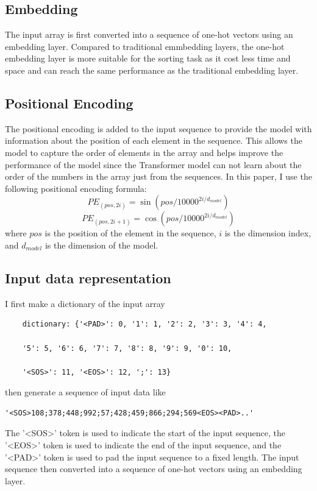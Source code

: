 \documentclass{article}
\begin{document}
\subsection{Embedding}
The input array is first converted into a sequence of one-hot vectors using an embedding layer.\cite{TransfomerPrograming} Compared to traditional emmbedding layers, the one-hot embedding layer is more suitable for the sorting task as it cost less time and space and can reach the same performance as the traditional embedding layer.

\subsection{Positional Encoding}
The positional encoding is added to the input sequence to provide the model with information about the position of each element in the sequence. This allows the model to capture the order of elements in the array and helps improve the performance of the model since the Transformer model can not learn about the order of the numbers in the array just from the sequences.
In this paper, I use the following positional encoding formula:
\begin{equation}
    PE_{(pos, 2i)} = \sin(pos / 10000^{2i / d_{model}})
\end{equation}
\begin{equation}
    PE_{(pos, 2i+1)} = \cos(pos / 10000^{2i / d_{model}})
\end{equation}
where $pos$ is the position of the element in the sequence, $i$ is the dimension index, and $d_{model}$ is the dimension of the model.

\subsection{Input data representation}
I first make a dictionary of the input array
\begin{verbatim}
    dictionary: {'<PAD>': 0, '1': 1, '2': 2, '3': 3, '4': 4,
    
    '5': 5, '6': 6, '7': 7, '8': 8, '9': 9, '0': 10,
    
    '<SOS>': 11, '<EOS>': 12, ';': 13}
\end{verbatim}
then generate a sequence of input data like 
\begin{verbatim}
'<SOS>108;378;448;992;57;428;459;866;294;569<EOS><PAD>..' 
\end{verbatim}
The '<SOS>' token is used to indicate the start of the input sequence, the '<EOS>' token is used to indicate the end of the input sequence, and the '<PAD>' token is used to pad the input sequence to a fixed length. The input sequence then converted into a sequence of one-hot vectors using an embedding layer.
\end{document}
